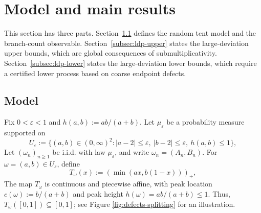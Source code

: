\documentclass[11pt]{amsart}
\numberwithin{equation}{section}
\theoremstyle{plain}
\theoremstyle{definition}
\theoremstyle{remark}
\begin{document}
\section{Model and main results}\label{sec:model-results}

This section has three parts. Section~\ref{subsec:model} defines the random tent model and the branch-count observable. Section~\ref{subsec:ldp-upper} states the large-deviation upper bounds, which are global consequences of submultiplicativity. Section~\ref{subsec:ldp-lower} states the large-deviation lower bounds, which require a certified lower process based on coarse endpoint defects.

\subsection{Model}\label{subsec:model}

Fix \(0<\varepsilon<1\) and \(h(a,b):=ab/(a+b)\). Let \(\mu_\varepsilon\) be a probability measure supported on
\[
U_\varepsilon
:=
\bigl\{(a,b)\in(0,\infty)^2:
|a-2|\le\varepsilon,\ |b-2|\le\varepsilon,\ h(a,b)\le1
\bigr\},
\]
Let \((\omega_n)_{n\ge1}\) be i.i.d. with law \(\mu_\varepsilon\), and write \(\omega_n=(A_n,B_n)\). For \(\omega=(a,b)\in U_\varepsilon\), define
\[
	T_\omega(x):=(\min(ax,b(1-x)))_+,
\]
The map \(T_\omega\) is continuous and piecewise affine, with peak location \(c(\omega):=b/(a+b)\) and peak height \(h(\omega)=ab/(a+b)\le1\). Thus, \(T_\omega([0,1])\subseteq[0,1]\); see Figure \ref{fig:defects-splitting} for an illustration.
\end{document}
